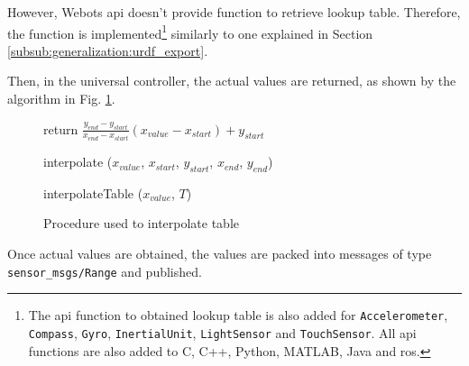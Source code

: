However, Webots \ac{api} doesn't provide function to retrieve lookup table.
Therefore, the function is implemented\footnote{The \ac{api} function to obtained lookup table is also added for \texttt{Accelerometer}, \texttt{Compass}, \texttt{Gyro}, \texttt{InertialUnit}, \texttt{LightSensor} and \texttt{TouchSensor}.
All \ac{api} functions are also added to C, C++, Python, MATLAB, Java and \ac{ros}.} similarly to one explained in Section \ref{subsub:generalization:urdf_export}.

Then, in the universal controller, the actual values are returned, as shown by the algorithm in Fig. \ref{fig:generalization:interopolation}.

\begin{figure}[H]
    \begin{minipage}{\linewidth}
    \begin{procedure}[H]
        return $ \frac{y_{end} - y_{start}}{x_{end} - x_{start}} (x_{value} - x_{start}) + y_{start}
 $ \;
        \caption{interpolate ($x_{value}$, $x_{start}$, $y_{start}$, $x_{end}$, $y_{end}$)}
    \end{procedure}
    \end{minipage}
    \begin{minipage}{\linewidth}
    \begin{procedure}[H]


        \caption{interpolateTable ($x_{value}$, $T$)}
    \end{procedure}
    \end{minipage}
\caption{Procedure used to interpolate table}
\label{fig:generalization:interopolation}
\end{figure}

Once actual values are obtained, the values are packed into messages of type \texttt{sensor\_msgs/Range} and published.

